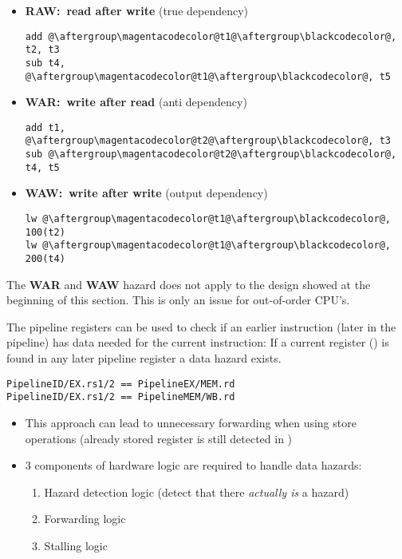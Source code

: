 \begin{itemize}
    \item \textbf{RAW:\ read after write} (true dependency)
          \begin{lstlisting}[escapechar=@]
add @\aftergroup\magentacodecolor@t1@\aftergroup\blackcodecolor@, t2, t3
sub t4, @\aftergroup\magentacodecolor@t1@\aftergroup\blackcodecolor@, t5
\end{lstlisting}
    \item \textbf{WAR:\ write after read} (anti dependency)
          \begin{lstlisting}[escapechar=@]
add t1, @\aftergroup\magentacodecolor@t2@\aftergroup\blackcodecolor@, t3
sub @\aftergroup\magentacodecolor@t2@\aftergroup\blackcodecolor@, t4, t5
\end{lstlisting}
    \item \textbf{WAW:\ write after write} (output dependency)
          \begin{lstlisting}[escapechar=@]
lw @\aftergroup\magentacodecolor@t1@\aftergroup\blackcodecolor@, 100(t2)
lw @\aftergroup\magentacodecolor@t1@\aftergroup\blackcodecolor@, 200(t4)
\end{lstlisting}
\end{itemize}

The \textbf{WAR} and \textbf{WAW} hazard does not apply to the design showed at the beginning of this section. This is only an issue for out-of-order CPU's.

\newpar{}

The pipeline registers can be used to check if an earlier instruction (later in the pipeline) has data needed for the current instruction:
If a current  register () is found in any later pipeline register a data hazard exists.
\begin{lstlisting}
PipelineID/EX.rs1/2 == PipelineEX/MEM.rd
PipelineID/EX.rs1/2 == PipelineMEM/WB.rd
    \end{lstlisting}

\newpar{}
\begin{itemize}
    \item This approach can lead to unnecessary forwarding when using store operations (already stored register is still detected in )
    \item 3 components of hardware logic are required to handle data hazards:
    \begin{enumerate}
        \item Hazard detection logic (detect that there \textit{actually is} a hazard)
        \item Forwarding logic 
        \item Stalling logic
    \end{enumerate}
\end{itemize}

